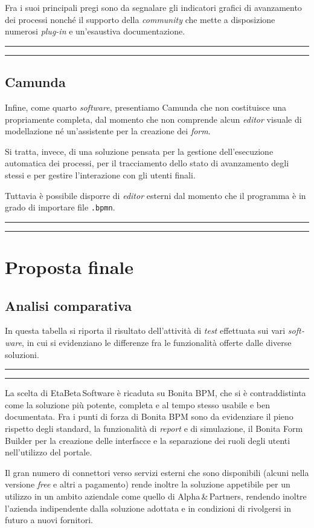 \documentclass[a4paper,10pt]{article}
\newcommand{\inglese}[1]{\foreignlanguage{english}{\textit{#1}}}
\newcommand{\team}{\textsf{EtaBeta\,Software}\xspace}
\newcommand{\sw}{\inglese{software}\xspace}
\newcommand{\customer}{\textsf{Alpha\,\&\,Partners}\xspace}
\newcommand{\cambioslide}{%
\begin{center}
\Large
\rule[4pt]{0.2\linewidth}{.7pt} \ding{167} \rule[4pt]{0.2\linewidth}{.7pt}
\end{center}
}
\newcommand{\ele}{%
\begin{center}
\fbox{$\mathcal{ELENA}$}
\end{center}
}
\begin{document}
Fra i suoi principali pregi sono da segnalare gli indicatori grafici di avanzamento dei processi nonché il supporto della \inglese{community} che mette a disposizione numerosi \inglese{plug-in} e un'esaustiva documentazione.
\cambioslide

\subsection{Camunda}
Infine, come quarto \sw, presentiamo Camunda che non costituisce una propriamente completa, dal momento che non comprende alcun \inglese{editor} visuale di modellazione né un'assistente per la creazione dei \inglese{form}.

Si tratta, invece, di una soluzione pensata per la gestione dell'esecuzione automatica dei processi, per il tracciamento dello stato di avanzamento degli stessi e per gestire l'interazione con gli utenti finali.

Tuttavia è possibile disporre di \inglese{editor} esterni dal momento che il programma è in grado di importare file \texttt{.bpmn}.

\cambioslide

\ele

\section{Proposta finale}

\subsection{Analisi comparativa}
In questa tabella si riporta il risultato dell'attività di \inglese{test} effettuata sui vari \sw, in cui si evidenziano le differenze fra le funzionalità offerte dalle diverse soluzioni.

\cambioslide

La scelta di \team è ricaduta su Bonita BPM, che si è contraddistinta come la soluzione più potente, completa e al tempo stesso usabile e ben documentata. Fra i punti di forza di Bonita BPM sono da evidenziare il pieno rispetto degli standard, la funzionalità di \inglese{report} e di simulazione, il Bonita Form Builder per la creazione delle interfacce e la separazione dei ruoli degli utenti nell'utilizzo del portale.

Il gran numero di connettori verso servizi esterni che sono disponibili (alcuni nella versione \inglese{free} e altri a pagamento) rende inoltre la soluzione appetibile per un utilizzo in un ambito aziendale come quello di \customer, rendendo inoltre l'azienda indipendente dalla soluzione adottata e in condizioni di rivolgersi in futuro a nuovi fornitori.
\end{document}
